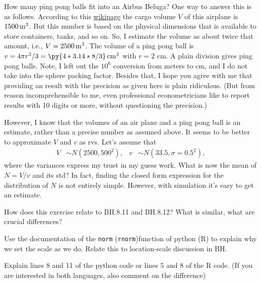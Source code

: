 \documentclass[assignments]{subfiles}
\begin{document}
How many ping pong balls fit into an Airbus Beluga?
One way to answer this is as follows.
According to this \href{https://en.wikipedia.org/wiki/Airbus\_Beluga}{wikipage} the cargo volume $V$ of this airplane is $1500 \,\mathrm{m}^{3}$.
But this number is based on the physical dimensions that is available to store containers, tanks, and so on.
So, I estimate the volume as about twice that amount, i.e., $V = 2500 \,\mathrm{m}^{3}$.
The volume of a ping pong ball is $v = 4 \pi r^3/3  = \py{4*3.14*8/3} \cm^{3}$ with $r=2$ cm.
A plain division gives  ping pong balls.
Note, I left out the $10^{6}$ conversion from meters to cm, and I do not take into the sphere packing factor.
Besides that, I hope you agree with me that providing an result with the precision as given here is plain ridiculous.
(But from reason incomprehensible to me, even professional econometricians like to report results with 10 digits or more, without questioning the precision.)


However, I know that the volumes of an air plane and a ping pong ball is an estimate, rather than a precise number as assumed above.
It seems to be better to approximate $V$ and $v$ as rvs.
Let's assume that
   \begin{align*}
V & \sim N(2500, 500^{2}), & v  & \sim N(33.5, \sigma=0.5^{2}),
\end{align*}
where the variances express my trust in my guess work.
What is now the mean of $N = V/v$ and its std?
In fact, finding the closed form expression for the distribution of $N$ is not entirely simple.
However, with simulation it's easy to get an estimate.

\begin{exercise}\label{ex:2}
 How does this exercise relate to BH.8.11 and BH.8.12? What is similar, what are crucial differences?
\end{exercise}

\begin{exercise}
Use the documentation of the \texttt{norm} (\texttt{rnorm})function of python (R) to explain why we set the scale as we do.
Relate this to location-scale discussion in BH.

\begin{solution}
\end{solution}
\end{exercise}

\begin{exercise}
Explain lines 8 and 11 of the python code or lines 5 and 8 of the R code. (If you are interested in both languages, also comment on the difference)
\begin{solution}
\end{solution}
\end{exercise}
\end{document}
